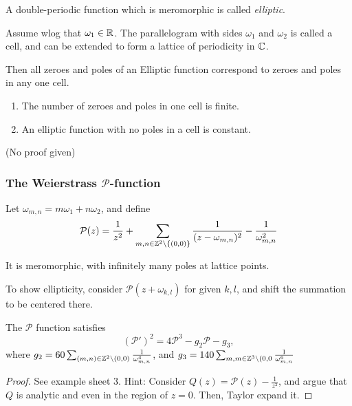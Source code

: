 \documentclass[a4paper]{article}
\begin{document}
\begin{defn}
	A double-periodic function which is meromorphic is called \textit{elliptic}.
\end{defn}

Assume wlog that $\omega_1 \in \mathbb{R}$. The parallelogram with sides $\omega_1$ and $\omega_2$ is called a cell, and can be extended to form a lattice of periodicity in $\mathbb{C}$. 

Then all zeroes and poles of an Elliptic function correspond to zeroes and poles in any one cell.

\begin{prop}
	\begin{enumerate}
		\item The number of zeroes and poles in one cell is finite. \\
		\item An elliptic function with no poles in a cell is constant.
	\end{enumerate}
\end{prop}

(No proof given)

\subsubsection*{The Weierstrass $\mathcal{P}$-function}

Let  $\omega_{m,n} = m\omega_1 + n\omega_2$, and define
\[
	\mathcal{P}(z) = \frac{1}{z^2}  + \sum_{m,n \in \mathbb{Z}^2\setminus{\{(0,0)\} }} \frac{1}{(z-\omega_{m,n})^2} -\frac{1}{\omega_{m,n}^2}
\] 

It is meromorphic, with infinitely many poles at lattice points.

To show ellipticity, consider $\mathcal{P}(z+\omega_{k,l})$ for given $k,l$, and shift the summation to be centered there. 

\begin{prop}
	The $\mathcal{P}$ function satisfies
	\[
		\left( \mathcal{P}' \right)^2 = 4 \mathcal{P}^3 - g_2 \mathcal{P} - g_3 
	,\] where $g_2 = 60 \sum_{(m,n)\in \mathbb{Z}^2\setminus (0,0)} \frac{1}{\omega_{m,n}^{4}}$, and $g_3 = 140 \sum_{m,m \in \mathbb{Z}^3\setminus (0,0}\frac{1}{\omega_{m,n}^{6}}$ 
\end{prop}

\begin{proof}
	See example sheet 3. Hint: Consider $Q(z) = \mathcal{P}(z) - \frac{1}{z^2}$, and argue that $Q$ is analytic and even in the region of $z=0$. Then, Taylor expand it.
\end{proof}
\end{document}
